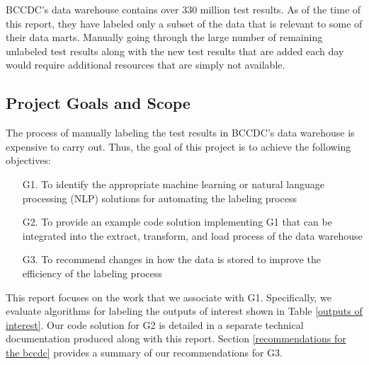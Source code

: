 \documentclass[11pt]{article}
\begin{document}
BCCDC's data warehouse contains over 330 million test results. As of the time of this report, they have labeled only a subset of the data that is relevant to some of their data marts. Manually going through the large number of remaining unlabeled test results along with the new test results that are added each day would require additional resources that are simply not available.


\subsection{Project Goals and Scope} \label{project goals and scope}

The process of manually labeling the test results in BCCDC's data warehouse is expensive to carry out. Thus, the goal of this project is to achieve the following objectives:

\begin{enumerate}

\item[G1.] To identify the appropriate machine learning or natural language processing (NLP) solutions for automating the labeling process

\item[G2.] To provide an example code solution implementing G1 that can be integrated into the extract, transform, and load process of the data warehouse

\item[G3.] To recommend changes in how the data is stored to improve the efficiency of the labeling process

\end{enumerate}

\noindent This report focuses on the work that we associate with G1. Specifically, we evaluate algorithms for labeling the outputs of interest shown in Table \ref{outputs of interest}. Our code solution for G2 is detailed in a separate technical documentation produced along with this report. Section \ref{recommendations for the bccdc} provides a summary of our recommendations for G3.
\\
\end{document}
